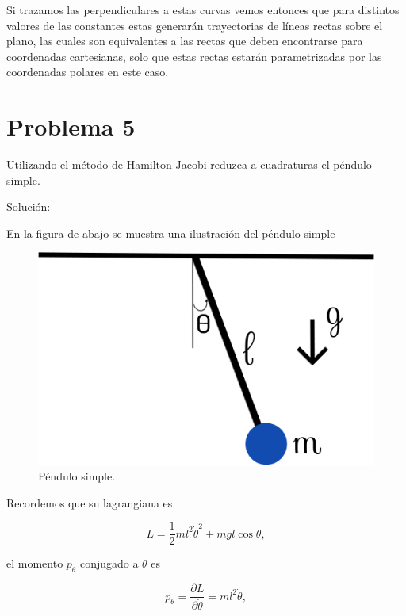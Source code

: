 \documentclass[a4paper,10pt]{article}
\numberwithin{equation}{section}
\begin{document}
Si trazamos las perpendiculares a estas curvas vemos entonces que para distintos valores de las constantes estas generarán trayectorias 
de líneas rectas sobre el plano, las cuales son equivalentes a las rectas que deben 
encontrarse para coordenadas cartesianas, solo que estas rectas estarán parametrizadas 
por las coordenadas polares en este caso.

\section{Problema 5}

Utilizando el método de Hamilton-Jacobi reduzca a cuadraturas el péndulo simple. 

\vspace{.3cm}

\underline{Solución:} \vspace{.3cm}

En la figura de abajo se muestra una ilustración del péndulo simple

\begin{figure}[H]
 \center 
 \includegraphics[scale=0.4]{problema5fig1}
 \caption{Péndulo simple.}
 \label{fig:problema5fig1}
\end{figure}

Recordemos que su lagrangiana es 

\begin{equation}
 L = \frac{1}{2}ml^2\dot{\theta}^2 + mgl\cos{\theta},
\end{equation}

el momento $p_\theta$ conjugado a $\theta$ es 

\begin{equation}
 p_\theta = \frac{\partial L}{\partial \dot{\theta}} = ml^2\dot{\theta},
\end{equation}
\end{document}
